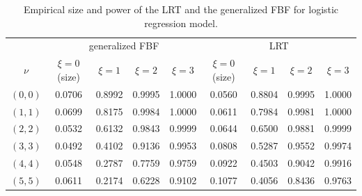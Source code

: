 \documentclass[11pt]{article}
\theoremstyle{plain}
\theoremstyle{definition}
\theoremstyle{remark}
\begin{document}
\begin{table}[ht]
    \caption{Empirical size and power of the LRT and the generalized FBF for logistic regression model.}
    \label{logistic_table1}
    \centering
    \begin{tabular}{ccccccccc}
        \toprule
          & \multicolumn{4}{c}{generalized FBF} &\multicolumn{4}{c}{LRT}\\
        \cmidrule(r){2-5}\cmidrule(r){6-9}
        $\nu$ 
        &$\xi= 0$ (size) & $\xi= 1$& $\xi= 2$ & $\xi= 3$ 
        &$\xi= 0$ (size) & $\xi= 1$& $\xi= 2$ & $\xi= 3$ 
        \\ 
        \midrule
        $(0,0)$ &0.0706&0.8992& 0.9995&1.0000&0.0560&0.8804& 0.9995& 1.0000   \\
        $(1,1)$ &0.0699&0.8175&0.9984& 1.0000  &0.0611&0.7984&0.9981& 1.0000   \\
        $(2,2)$ &0.0532&0.6132&0.9843& 0.9999&0.0644&0.6500&0.9881&0.9999 \\
        $(3,3)$ &0.0492&0.4102&0.9136& 0.9953 & 0.0808 &0.5287& 0.9552& 0.9974  \\
        $(4,4)$ &0.0548&0.2787 & 0.7759 & 0.9759& 0.0922  & 0.4503 & 0.9042& 0.9916   \\
        $(5,5)$ &0.0611&0.2174& 0.6228& 0.9102& 0.1077 & 0.4056&  0.8436& 0.9763 \\
        \bottomrule
    \end{tabular}
\end{table}

\end{document}
